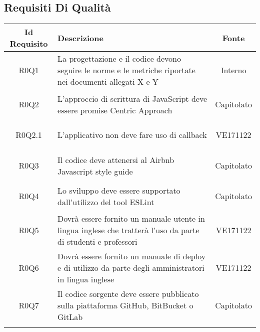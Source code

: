 \subsection{Requisiti Di Qualità}
\normalsize
\begin{longtable}{|c|>{\centering}m{7cm}|c|}
\hline
\textbf{Id Requisito} & \textbf{Descrizione} & \textbf{Fonte}\\
\hline
\endhead
\hypertarget{R0Q1}{R0Q1} & La progettazione e il codice devono seguire le norme e le metriche riportate nei documenti allegati X e Y & Interno \\ \hline 
\hypertarget{R0Q2}{R0Q2} & L'approccio di scrittura di JavaScript deve essere promise Centric Approach & Capitolato \\ \hline 
\hypertarget{R0Q2.1}{R0Q2.1} & L'applicativo non deve fare uso di callback & VE171122 \\ \hline 
\hypertarget{R0Q3}{R0Q3} & Il codice deve attenersi al Airbnb Javascript style guide & Capitolato \\ \hline 
\hypertarget{R0Q4}{R0Q4} & Lo sviluppo deve essere supportato dall'utilizzo del tool ESLint & Capitolato \\ \hline 
\hypertarget{R0Q5}{R0Q5} & Dovrà essere fornito un manuale utente in lingua inglese che tratterà l'uso da parte di studenti e professori & VE171122 \\ \hline 
\hypertarget{R0Q6}{R0Q6} & Dovrà essere fornito un manuale di deploy e di utilizzo da parte degli amministratori in lingua inglese & VE171122 \\ \hline 
\hypertarget{R0Q7}{R0Q7} & Il codice sorgente deve essere pubblicato sulla piattaforma GitHub, BitBucket o GitLab & Capitolato \\ \hline 
\caption[Requisiti Di Qualità]{Requisiti Di Qualità
\label{tabella:req1}
\end{longtable}
\clearpage
